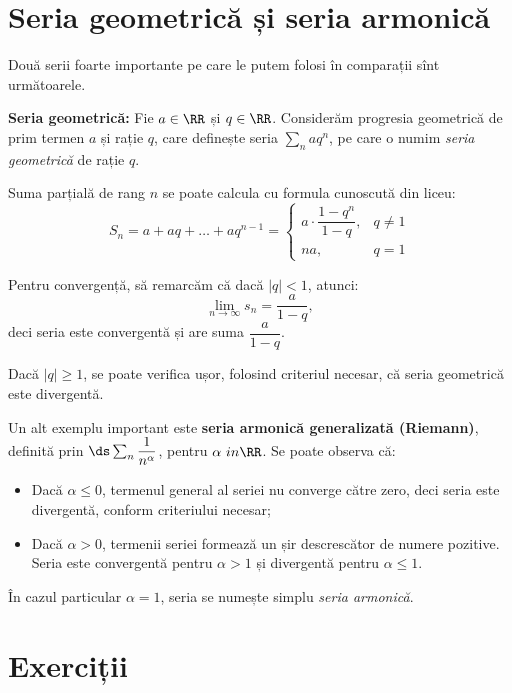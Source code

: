 
\section{Seria geometrică și seria armonică}

Două serii foarte importante pe care le putem folosi în comparații sînt
următoarele.

\textbf{Seria geometrică:} Fie $ a \in \RR $ și $ q \in \RR $. Considerăm
progresia geometrică de prim termen $ a $ și rație $ q $, care definește
seria $ \sum_n aq^n $, pe care o numim \emph{seria geometrică} de rație $ q $.

Suma parțială de rang $ n $ se poate calcula cu formula cunoscută din liceu:
\[
  S_n = a + aq + \dots + aq^{n-1} = %
  \begin{cases}
    a \cdot \dfrac{1 - q^n}{1 - q}, & q \neq 1 \\
    na, & q = 1
  \end{cases}
\]

Pentru convergență, să remarcăm că dacă $ |q| < 1 $, atunci:
\[
  \lim_{n \to \infty} s_n = \frac{a}{1 - q},
\]
deci seria este convergentă și are suma $ \dfrac{a}{1 - q} $.

Dacă $ |q| \geq 1 $, se poate verifica ușor, folosind criteriul
necesar, că seria geometrică este divergentă.

Un alt exemplu important este \textbf{seria armonică generalizată (Riemann)},
definită prin $ \ds\sum_n \dfrac{1}{n^\alpha} $, pentru $ \alpha \ in \RR $.
Se poate observa că:
\begin{itemize}
\item Dacă $ \alpha \leq 0 $, termenul general al seriei nu converge către
  zero, deci seria este divergentă, conform criteriului necesar;
\item Dacă $ \alpha > 0 $, termenii seriei formează un șir descrescător de
  numere pozitive. Seria este convergentă pentru $ \alpha > 1 $ și
  divergentă pentru $ \alpha \leq 1 $.
\end{itemize}

În cazul particular $ \alpha = 1 $, seria se numește simplu \emph{seria armonică}.


\section{Exerciții}

